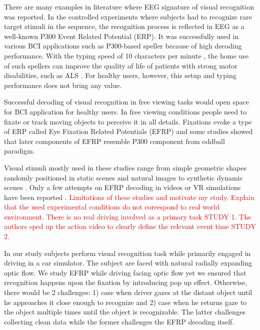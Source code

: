 \documentclass[12pt]{iopart}
\begin{document}
There are many examples in literature where EEG signature
of visual recognition was reported.
In the controlled experiments where subjects had to recognize
rare target stimuli in the sequence, the recognition process
is reflected in EEG as a well-known P300 Event Related Potential (ERP).
It was successfully used in various BCI applications such as
P300-based speller because of high decoding performance.
With the typing speed of 10 characters per minute \cite{rezeika_braincomputer_2018},
the home use of such spellers can improve the quality of life
of patients with strong motor disabilities, such as ALS \cite{sellers_brain-computer_2010,holz_long-term_2015}.
For healthy users, however, this setup and typing performance does not bring any value.

Successful decoding of visual recognition in free viewing tasks
would open space for BCI application for healthy users.
In free viewing conditions people need to fixate
or track moving objects to perceive it in all details.
Fixations evoke a type of ERP called Eye Fixation Related Potentials (EFRP)
and some studies showed that later components of EFRP resemble P300
component from oddball paradigm.

Visual stimuli mostly used in these studies range from simple geometric shapes
randomly positioned in static scenes and natural images to synthetic dynamic
scenes \cite{}. Only a few attempts on EFRP decoding in videos or VR simulations
have been reported \cite{}. \textcolor{red}{Limitations of these studies
and motivate my study.
Explain that the used experimental conditions do not correspond to real world environment.
There is no real driving involved as a primary task STUDY 1.
The authors sped up the action video to clearly define the relevant
event time STUDY 2.}

In our study subjects perform visual recognition task while primarily engaged
in driving in a car simulator.
The subject are faced with natural radially expanding optic flow.
We study EFRP
while driving
facing optic flow
yet we ensured that recognition happens upon the fixation by introducing pop up effect.
Otherwise, there would be 2 challenges: 
1) case when driver gazes at the distant object
until he approaches it close enough to recognize and
2) case when he returns gaze to the object multiple times until the object
is recognizable.
The latter challenges collecting clean data while the former challenges
the EFRP decoding itself.




\end{document}
